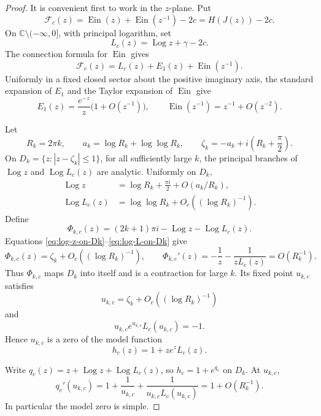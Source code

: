 \documentclass[11pt]{article}
\theoremstyle{definition}
\theoremstyle{remark}
\newcommand{\C}{\mathbb C}
\newcommand{\Ein}{\operatorname{Ein}}
\newcommand{\Log}{\operatorname{Log}}
\begin{document}
\begin{proof}
It is convenient first to work in the $z$-plane.  Put
\[
 \mathcal F_c(z)=\Ein(z)+\Ein(z^{-1})-2c
                =H(J(z))-2c.
\]
On $\C\setminus(-\infty,0]$, with principal logarithm, set
\[
 L_c(z)=\Log z+\gamma-2c.
\]
The connection formula for $\Ein$ gives
\begin{equation}\label{eq:Fc-connection}
 \mathcal F_c(z)=L_c(z)+E_1(z)+\Ein(z^{-1}).
\end{equation}
Uniformly in a fixed closed sector about the positive imaginary axis,
the standard expansion of $E_1$ \cite{DLMF} and the Taylor expansion of
$\Ein$ give
\begin{equation}\label{eq:Fc-asymptotic-input}
 E_1(z)=\frac{e^{-z}}z\bigl(1+O(z^{-1})\bigr),
 \qquad
 \Ein(z^{-1})=z^{-1}+O(z^{-2}).
\end{equation}

Let
\[
 R_k=2\pi k,\qquad
 a_k=\log R_k+\log\log R_k,\qquad
 \zeta_k=-a_k+i\left(R_k+\frac\pi2\right).
\]
On $D_k=\{z:|z-\zeta_k|\leq1\}$, for all sufficiently large $k$, the
principal branches of $\Log z$ and $\Log L_c(z)$ are analytic.  Uniformly
on $D_k$,
\begin{align}
 \Log z&=\log R_k+\frac{\pi i}{2}
          +O(a_k/R_k),\label{eq:log-z-on-Dk}\\
 \Log L_c(z)&=\log\log R_k+O_c((\log R_k)^{-1}).
 \label{eq:log-L-on-Dk}
\end{align}
Define
\[
 \Phi_{k,c}(z)=(2k+1)\pi i-\Log z-\Log L_c(z).
\]
Equations \eqref{eq:log-z-on-Dk}--\eqref{eq:log-L-on-Dk} give
\[
 \Phi_{k,c}(z)=\zeta_k+O_c((\log R_k)^{-1}),
 \qquad
 \Phi_{k,c}'(z)=-\frac1z-\frac1{zL_c(z)}=O(R_k^{-1}).
\]
Thus $\Phi_{k,c}$ maps $D_k$ into itself and is a contraction for large
$k$.  Its fixed point $u_{k,c}$ satisfies
\begin{equation}\label{eq:model-root-asymptotic}
 u_{k,c}=\zeta_k+O_c((\log R_k)^{-1})
\end{equation}
and
\[
 u_{k,c}e^{u_{k,c}}L_c(u_{k,c})=-1.
\]
Hence $u_{k,c}$ is a zero of the model function
\[
 h_c(z)=1+ze^zL_c(z).
\]

Write $q_c(z)=z+\Log z+\Log L_c(z)$, so
$h_c=1+e^{q_c}$ on $D_k$.  At $u_{k,c}$,
\begin{equation}\label{eq:model-derivative}
 q_c'(u_{k,c})
 =1+\frac1{u_{k,c}}+\frac1{u_{k,c}L_c(u_{k,c})}
 =1+O(R_k^{-1}).
\end{equation}
In particular the model zero is simple.


\end{proof}
\end{document}
